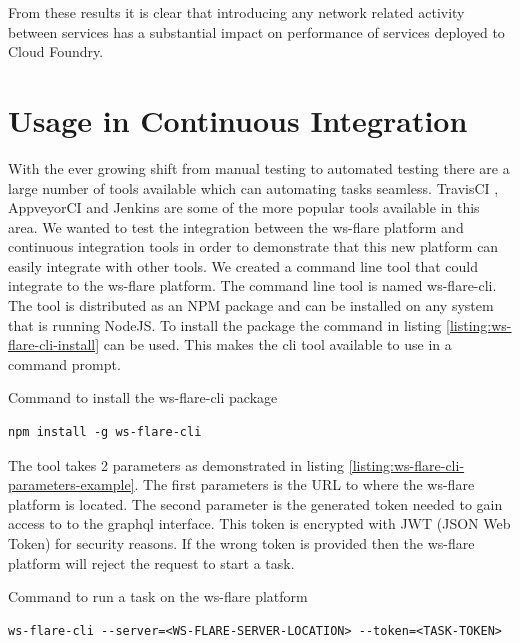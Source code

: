 From these results it is clear that introducing any network related activity between services has a substantial impact on performance of services deployed to Cloud Foundry.

\section{Usage in Continuous Integration}

With the ever growing shift from manual testing to automated testing there are a large number of tools available which can automating tasks seamless. TravisCI \cite{travisCI}, AppveyorCI \cite{appveyorCI} and Jenkins \cite{jenkinsCi} are some of the more popular tools available in this area. We wanted to test the integration between the ws-flare platform and continuous integration tools in order to demonstrate that this new platform can easily integrate with other tools. We created a command line tool that could integrate to the ws-flare platform. The command line tool is named ws-flare-cli. The tool is distributed as an NPM package and can be installed on any system that is running NodeJS. To install the package the command in listing \ref{listing:ws-flare-cli-install} can be used. This makes the cli tool available to use in a command prompt.

\begin{listing}[H]
    \caption{Command to install the ws-flare-cli package}
    \label{listing:ws-flare-cli-install}
    \begin{verbatim}
npm install -g ws-flare-cli
\end{verbatim}
\end{listing}

The tool takes 2 parameters as demonstrated in listing \ref{listing:ws-flare-cli-parameters-example}. The first parameters is the URL to where the ws-flare platform is located. The second parameter is the generated token needed to gain access to to the graphql interface. This token is encrypted with JWT (JSON Web Token) for security reasons. If the wrong token is provided then the ws-flare platform will reject the request to start a task.

\begin{listing}[H]
    \caption{Command to run a task on the ws-flare platform}
    \label{listing:ws-flare-cli-parameters-example}
    \begin{verbatim}
ws-flare-cli --server=<WS-FLARE-SERVER-LOCATION> --token=<TASK-TOKEN>
\end{verbatim}
\end{listing}

